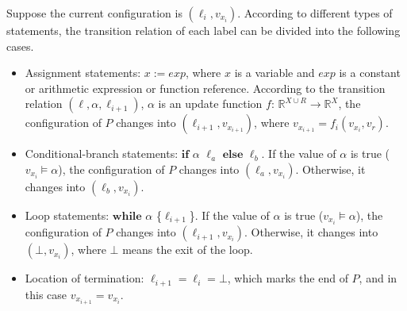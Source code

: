 \documentclass[conference]{IEEEtran}
\begin{document}
Suppose the current configuration is $(\ell_i, v_{x_i})$. According to different types of statements, the transition relation of each label can be divided into the following cases. 
\renewcommand{\labelitemi}{$\vcenter{\hbox{\tiny$\bullet$}}$}
\begin{itemize}
	\item  Assignment statements: $x:=exp$, where $x$ is a variable and $exp$ is a constant or arithmetic expression or function reference. According to the transition relation $(\ell, \alpha, \ell_{i+1})$, $\alpha$ is an update function $f$: $\mathbb{R}^{X\cup R}\to \mathbb{R}^{X}$, the configuration of $P$ changes into $(\ell_{i+1}, v_{x_{i+1}})$, where $v_{x_{i+1}} = f_i(v_{x_{i}},v_r)$.
	
	\item  Conditional-branch statements: $\textbf{if}$  $\alpha$  $\ell_a$ $\textbf{else}$ $\ell_b$. If the value of $\alpha$ is true ($v_{x_i} \models \alpha$), the configuration of $P$ changes into $(\ell_a, v_{x_i})$. Otherwise, it changes into $(\ell_b, v_{x_i})$.
	
	\item  Loop statements: $\textbf{while}$ $\alpha$ \{$\ell_{i+1}$\}. If the value of $\alpha$ is true ($v_{x_i} \models \alpha$), the configuration of $P$ changes into $(\ell_{i+1}, v_{x_i})$. Otherwise, it changes into $(\bot, v_{x_i})$, where $\bot$ means the exit of the loop.
	
	\item  Location of termination: $\ell_{i+1} =\ell_{i}=\bot$, which marks the end of $P$, and in this case $v_{x_{i+1}} = v_{x_i}$.
\end{itemize}
\end{document}
